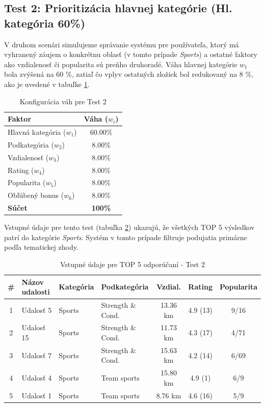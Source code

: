 \subsection{Test 2: Prioritizácia hlavnej kategórie (Hl. kategória 60\%)}

V druhom scenári simulujeme správanie systému pre používateľa, ktorý má vyhranený záujem o konkrétnu oblasť (v tomto prípade \textit{Sports}) a ostatné faktory ako vzdialenosť či popularita sú preňho druhoradé. Váha hlavnej kategórie $w_1$ bola zvýšená na 60 \%, zatiaľ čo vplyv ostatných zložiek bol redukovaný na 8 \%, ako je uvedené v tabuľke \ref{tab:vahy_test2}.

\begin{table}[H]
\centering
\begin{tabular}{|l|c|}
\hline
\textbf{Faktor} & \textbf{Váha ($w_i$)} \\
\hline
Hlavná kategória ($w_1$) & 60.00\% \\
Podkategória ($w_2$) & 8.00\% \\
Vzdialenosť ($w_3$) & 8.00\% \\
Rating ($w_4$) & 8.00\% \\
Popularita ($w_5$) & 8.00\% \\
Obľúbený bonus ($w_6$) & 8.00\% \\
\hline
\textbf{Súčet} & \textbf{100\%} \\
\hline
\end{tabular}
\caption{Konfigurácia váh pre Test 2}
\label{tab:vahy_test2}
\end{table}

Vstupné údaje pre tento test (tabuľka \ref{tab:data_test2}) ukazujú, že všetkých TOP 5 výsledkov patrí do kategórie \textit{Sports}. Systém v tomto prípade filtruje podujatia primárne podľa tematickej zhody.

\begin{table}[H]
\centering
\small
\begin{tabular}{|c|l|l|l|c|c|c|}
\hline
\textbf{\#} & \textbf{Názov udalosti} & \textbf{Kategória} & \textbf{Podkategória} & \textbf{Vzdial.} & \textbf{Rating} & \textbf{Popularita} \\
\hline
1 & Udalosť 5  & Sports & Strength \& Cond. & 13.36 km & 4.9 (13) & 9/16 \\
2 & Udalosť 15 & Sports & Strength \& Cond. & 11.73 km & 4.3 (17) & 4/71 \\
3 & Udalosť 7  & Sports & Strength \& Cond. & 15.63 km & 4.2 (14) & 6/69 \\
4 & Udalosť 4  & Sports & Team sports       & 15.80 km & 4.9 (1)  & 6/9 \\
5 & Udalosť 1  & Sports & Team sports       & 8.76 km  & 4.6 (16) & 5/9 \\
\hline
\end{tabular}
\caption{Vstupné údaje pre TOP 5 odporúčaní - Test 2}
\label{tab:data_test2}
\end{table}


